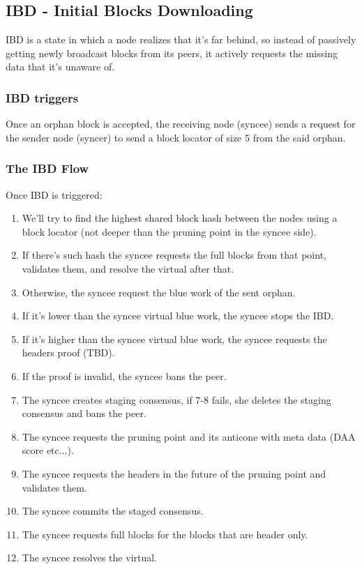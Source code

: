 \subsection{IBD - Initial Blocks Downloading}
\label{part2:kaspad:p2p:ibd}

IBD is a state in which a node realizes that it's far behind, so instead of passively getting newly broadcast blocks
from its peers, it actively requests the missing data that it's unaware of.

\subsubsection{IBD triggers}
\label{part2:kaspad:p2p:ibd:triggers}

Once an orphan block is accepted, the receiving node (syncee) sends a request for the sender node (syncer) to send a
block locator of size 5 from the said orphan.

\subsubsection{The IBD Flow}
\label{part2:kaspad:p2p:ibd:flow}

Once IBD is triggered:

\begin{enumerate}
\item We'll try to find the highest shared block hash between the nodes using a block locator (not deeper than the pruning
   point in the syncee side).
\item If there's such hash the syncee requests the full blocks from that point, validates them, and resolve the virtual
   after that.
\item Otherwise, the syncee request the blue work of the sent orphan.
\item If it's lower than the syncee virtual blue work, the syncee stops the IBD.
\item If it's higher than the syncee virtual blue work, the syncee requests the headers proof (TBD).
\item If the proof is invalid, the syncee bans the peer.
\item The syncee creates staging consensus, if 7-8 fails, she deletes the staging consensus and bans the peer.
\item The syncee requests the pruning point and its anticone with meta data (DAA score etc...).
\item The syncee requests the headers in the future of the pruning point and validates them.
\item The syncee commits the staged consensus.
\item The syncee requests full blocks for the blocks that are header only.
\item The syncee resolves the virtual.
\end{enumerate}

